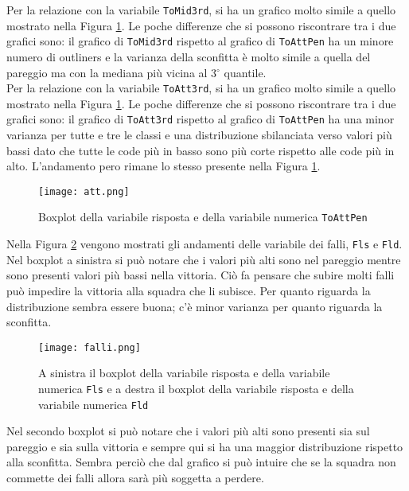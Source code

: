 Per la relazione con la variabile \texttt{ToMid3rd}, si ha un grafico molto simile a quello mostrato nella Figura \ref{fig:att}. Le poche differenze che si possono riscontrare tra i due grafici sono: il grafico di \texttt{ToMid3rd} rispetto al grafico di \texttt{ToAttPen} ha un minore numero di outliners e la varianza della sconfitta è molto simile a quella del pareggio ma con la mediana più vicina al 3$^{\circ}$ quantile.\\

Per la relazione con la variabile \texttt{ToAtt3rd}, si ha un grafico molto simile a quello mostrato nella Figura \ref{fig:att}. Le poche differenze che si possono riscontrare tra i due grafici sono: il grafico di \texttt{ToAtt3rd} rispetto al grafico di \texttt{ToAttPen} ha una minor varianza per tutte e tre le classi e una distribuzione sbilanciata verso valori più bassi dato che tutte le code più in basso sono più corte rispetto alle code più in alto. L'andamento pero rimane lo stesso presente nella Figura \ref{fig:att}.\\

\begin{figure}[htbp]
	\begin{center}
		\texttt{[image: att.png]}
		\caption{Boxplot della variabile risposta e della variabile numerica \texttt{ToAttPen} } \label{fig:att}
	\end{center}
\end{figure}

Nella Figura \ref{fig:falli} vengono mostrati gli andamenti delle variabile dei falli, \texttt{Fls} e \texttt{Fld}. Nel boxplot a sinistra si può notare che i valori più alti sono nel pareggio mentre sono presenti valori più bassi nella vittoria. Ciò fa pensare che subire molti falli può impedire la vittoria alla squadra che li subisce. Per quanto riguarda la distribuzione sembra essere buona; c'è minor varianza per quanto riguarda la sconfitta. \\

\begin{figure}[htbp]
	\begin{center}
		\texttt{[image: falli.png]}
		\caption{A sinistra il boxplot della variabile risposta e della variabile numerica \texttt{Fls} e a destra il boxplot della variabile risposta e della variabile numerica \texttt{Fld} } \label{fig:falli}
	\end{center}
\end{figure}

Nel secondo boxplot si può notare che i valori più alti sono presenti sia sul pareggio e sia sulla vittoria e sempre qui si ha una maggior distribuzione rispetto alla sconfitta. Sembra perciò che dal grafico si può intuire che se la squadra non commette dei falli allora sarà più soggetta a perdere.\\

